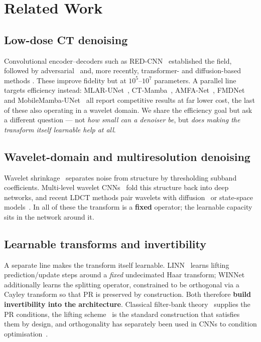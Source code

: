 \documentclass[conference]{IEEEtran}
\begin{document}
\section{Related Work}

\subsection{Low-dose CT denoising}
Convolutional encoder--decoders such as RED-CNN~\cite{chen2017redcnn}
established the field, followed by adversarial~\cite{yang2018wganvgg,%
huang2022dugan} and, more recently, transformer- and diffusion-based methods
\cite{wang2023ctformer,zhang2021transct,wang2021tednet,chen2024litformer,%
gao2024corediff,gao2025need,chen2026founddiff,sun2026wdbdm}. These improve
fidelity but at $10^5$--$10^7$ parameters. A parallel line targets efficiency
instead: MLAR-UNet~\cite{tang2025mlarunet}, CT-Mamba~\cite{li2025ctmamba},
AMFA-Net~\cite{li2026amfanet}, FMDNet~\cite{yao2026fmdnet} and
MobileMamba-UNet~\cite{li2026mobilemambaunet}
all report competitive results at far lower cost, the last of these also
operating in a wavelet domain. We share the efficiency goal but ask a different
question --- not \emph{how small can a denoiser be}, but \emph{does making the
transform itself learnable help at all}.

\subsection{Wavelet-domain and multiresolution denoising}
Wavelet shrinkage~\cite{donoho1994ideal,donoho1995denoising} separates noise from
structure by thresholding subband coefficients. Multi-level wavelet
CNNs~\cite{liu2018mwcnn,li2020wavecnet} fold this structure back into deep
networks, and recent LDCT methods pair wavelets with diffusion~\cite{sun2026wdbdm}
or state-space models~\cite{li2026mobilemambaunet}. In all of these the transform
is a \textbf{fixed} operator; the learnable capacity sits in the network around
it.

\subsection{Learnable transforms and invertibility}
A separate line makes the transform itself learnable. LINN~\cite{huang2021linn}
learns lifting prediction/update steps around a \emph{fixed} undecimated Haar
transform; WINNet~\cite{huang2022winnet} additionally learns the splitting
operator, constrained to be orthogonal via a Cayley transform so that PR is
preserved by construction. Both therefore \textbf{build invertibility into the
architecture}. Classical filter-bank theory~\cite{vetterli1986filter,%
vetterli1995wavelets} supplies the PR conditions, the lifting
scheme~\cite{daubechies1998factoring,sweldens1996lifting} is the standard
construction that satisfies them by design, and orthogonality has separately been
used in CNNs to condition optimisation~\cite{wang2020orthogonal}.
\end{document}
